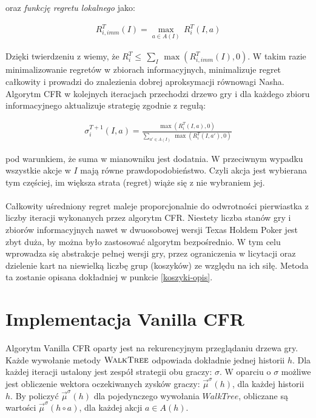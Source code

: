 \documentclass[magisterska]{pracamgr}
\begin{document}
\noindent
oraz \emph{funkcję regretu lokalnego} jako:

\begin{align*}
R_{i, imm}^T(I) = \max_{a \in A(I)} \, R_i^T(I, a)
\end{align*}

\noindent
Dzięki twierdzeniu z \cite{cfr} wiemy, że $R_i^T \leq \, \sum_{I} \, \max(R_{i, imm}^T(I), 0)$. W takim razie
minimalizowanie regretów w zbiorach informacyjnych, minimalizuje regret całkowity i prowadzi do znalezienia
dobrej aproksymacji równowagi Nasha. \\

\noindent
Algorytm CFR w kolejnych iteracjach przechodzi drzewo gry i dla każdego zbioru informacyjnego aktualizuje strategię
zgodnie z regułą:

\begin{align*}
\sigma_i^{T+1} (I, a) = \frac{\max(R_i^T(I, a), 0)}{\sum\limits_{a' \in A(I)} \, \max(R_i^T(I, a'), 0)}
\end{align*}

\noindent
pod warunkiem, że suma w mianowniku jest dodatnia. W przeciwnym wypadku wszystkie akcje w $I$ mają równe prawdopodobieństwo.
Czyli akcja jest wybierana tym częściej, im większa strata (regret) wiąże się z nie wybraniem jej.\\\\

\noindent
Całkowity uśredniony regret maleje proporcjonalnie do odwrotności pierwiastka z liczby iteracji wykonanych przez algorytm CFR. Niestety
liczba stanów gry i zbiorów informacyjnych nawet w dwuosobowej wersji Texas Holdem Poker jest zbyt duża, by można było
zastosować algorytm bezpośrednio. W tym celu wprowadza się abstrakcje pełnej wersji gry, przez ograniczenia w licytacji
oraz dzielenie kart na niewielką liczbę grup (koszyków) ze względu na ich siłę. Metoda ta zostanie opisana dokładniej
w punkcie \ref{koszyki-opis}. \\

\section{Implementacja Vanilla CFR}
\label{impl-cfr}

\noindent
Algorytm Vanilla CFR oparty jest na rekurencyjnym przeglądaniu drzewa gry. Każde wywołanie metody $\Call{WalkTree}{}$ odpowiada dokładnie jednej
historii $h$. Dla każdej iteracji ustalony jest zespół strategii obu
graczy: $\sigma$. W oparciu o $\sigma$ możliwe jest obliczenie wektora oczekiwanych zysków graczy: $\vec{\mu}^{\sigma}(h)$, dla każdej historii $h$.
By policzyć $\vec{\mu}^{\sigma}(h)$ dla pojedynczego wywołania $WalkTree$, obliczane są wartości $\vec{\mu}^{\sigma}(h \circ a)$, dla każdej
akcji $a \in A(h)$. \\ 
\end{document}
